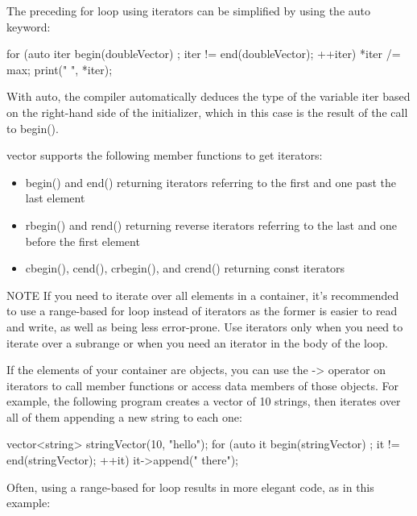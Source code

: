 The preceding for loop using iterators can be simplified by using the auto keyword:

\begin{cpp}
for (auto iter { begin(doubleVector) };
    iter != end(doubleVector); ++iter) {
    *iter /= max;
    print("{} ", *iter);
}
\end{cpp}

With auto, the compiler automatically deduces the type of the variable iter based on the right-hand side of the initializer, which in this case is the result of the call to begin().

vector supports the following member functions to get iterators:

\begin{itemize}
\item
begin() and end() returning iterators referring to the first and one past the last element

\item
rbegin() and rend() returning reverse iterators referring to the last and one before the first element

\item
cbegin(), cend(), crbegin(), and crend() returning const iterators
\end{itemize}

\begin{myNotic}{NOTE}
If you need to iterate over all elements in a container, it’s recommended to use a range-based for loop instead of iterators as the former is easier to read and write, as well as being less error-prone. Use iterators only when you need to iterate over a subrange or when you need an iterator in the body of the loop.
\end{myNotic}


If the elements of your container are objects, you can use the -> operator on iterators to call member functions or access data members of those objects. For example, the following program creates a vector of 10 strings, then iterates over all of them appending a new string to each one:

\begin{cpp}
vector<string> stringVector(10, "hello");
for (auto it { begin(stringVector) }; it != end(stringVector); ++it) {
    it->append(" there");
}
\end{cpp}

Often, using a range-based for loop results in more elegant code, as in this example:

